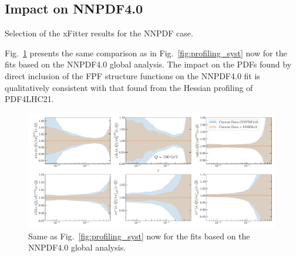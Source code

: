 \subsection{Impact on NNPDF4.0}
\label{sec:nnpdf40}

Selection of the {\sc\small xFitter} results for the NNPDF case.

Fig.~\ref{fig:nnpdf40_fasernu2_baseline} presents the same comparison
as in Fig.~\ref{fig:profiling_syst} now for
 the fits
 based on the NNPDF4.0 global analysis.
 The impact on the PDFs found by direct inclusion of the FPF structure
 functions on the NNPDF4.0 fit is qualitatively consistent with
 that found from the Hessian profiling of PDF4LHC21.

\begin{figure}[t]
\centering
\includegraphics[width=0.99\textwidth]{plots/FASERnu2-q100gev-ratios.pdf}
\caption{
  Same as Fig.~\ref{fig:profiling_syst} now for the fits
  based on the NNPDF4.0 global analysis.
%
}
\label{fig:nnpdf40_fasernu2_baseline}
\end{figure}

